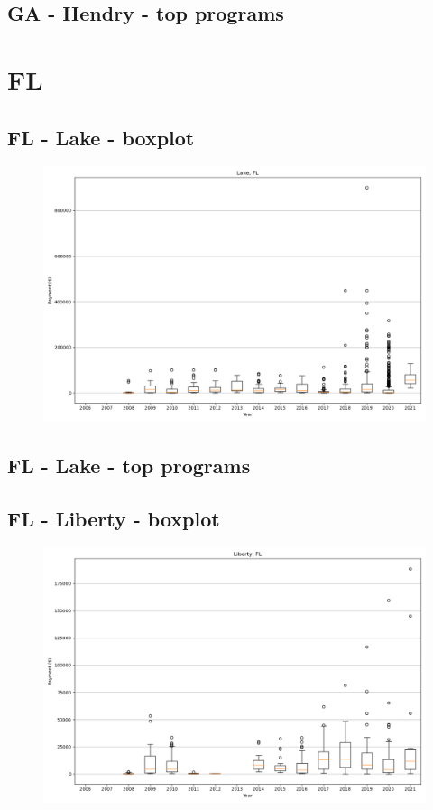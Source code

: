 \subsection*{GA - Hendry - top programs}

\newpage
\section*{FL}
\subsection*{FL - Lake - boxplot}
\begin{figure}[h]
\centering
\includegraphics[width=7in]{../output/boxplots/counties/Lake-FL_boxplot.png}
\end{figure}


\subsection*{FL - Lake - top programs}

\newpage
\subsection*{FL - Liberty - boxplot}
\begin{figure}[h]
\centering
\includegraphics[width=7in]{../output/boxplots/counties/Liberty-FL_boxplot.png}
\end{figure}


